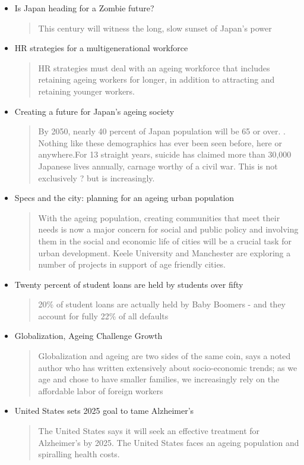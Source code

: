 \begin{itemize}
	\item Is Japan heading for a Zombie future?
	\begin{quotation}
		This century will witness the long, slow sunset of Japan's power\end{quotation}
	\item HR strategies for a multigenerational workforce
	\begin{quotation}
		HR strategies must deal with an ageing workforce that includes retaining ageing workers for longer, in addition to attracting and retaining younger workers.\end{quotation}
	\item Creating a future for Japan's ageing society
	\begin{quotation}By 2050, nearly 40 percent of Japan population will be 65 or over. . Nothing like these demographics has ever been seen before, here or anywhere.For 13 straight years, suicide has claimed more than 30,000 Japanese lives annually, carnage worthy of a civil war. This is not exclusively ? but is increasingly.\end{quotation}
	\item Specs and the city: planning for an ageing urban population
	\begin{quotation}With the ageing population, creating communities that meet their needs is now a major concern for social and public policy and involving them in the social and economic life of cities will be a crucial task for urban development. Keele University and Manchester are exploring a number of projects in support of age friendly cities.\end{quotation}
	\item Twenty percent of student loans are held by students over fifty
	\begin{quotation}20\% of student loans are actually held by Baby Boomers - and they account for fully 22\% of all defaults\end{quotation}
	\item Globalization, Ageing Challenge Growth
	\begin{quotation}Globalization and ageing are two sides of the same coin, says a noted author who has written extensively about socio-economic trends; as we age and chose to have smaller families, we increasingly rely on the affordable labor of foreign workers\end{quotation}
	\item United States sets 2025 goal to tame Alzheimer's
	\begin{quotation}The United States says it will seek an effective treatment for Alzheimer's by 2025.  The United States faces an ageing population and spiralling health costs.\end{quotation}

\end{itemize}
